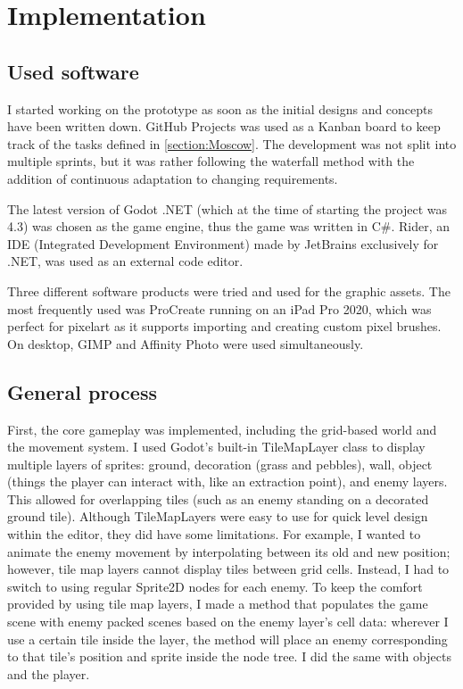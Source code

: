 \chapter{Implementation} \label{Chapter:Implementation}

\section{Used software}

I started working on the prototype as soon as the initial designs and concepts have been written down. GitHub Projects\cite{gitHub} was used as a Kanban board to keep track of the tasks defined in \ref{section:Moscow}. The development was not split into multiple sprints, but it was rather following the waterfall method with the addition of continuous adaptation to changing requirements.

The latest version of Godot .NET (which at the time of starting the project was 4.3) was chosen as the game engine, thus the game was written in C\#. Rider, an IDE (Integrated Development Environment) made by JetBrains exclusively for .NET, was used as an external code editor. 

Three different software products were tried and used for the graphic assets. The most frequently used was ProCreate running on an iPad Pro 2020, which was perfect for pixelart as it supports importing and creating custom pixel brushes. On desktop, GIMP and Affinity Photo were used simultaneously.

\section{General process}

First, the core gameplay was implemented, including the grid-based world and the movement system. I used Godot's built-in TileMapLayer class to display multiple layers of sprites: ground, decoration (grass and pebbles), wall, object (things the player can interact with, like an extraction point), and enemy layers. This allowed for overlapping tiles (such as an enemy standing on a decorated ground tile). Although TileMapLayers were easy to use for quick level design within the editor, they did have some limitations. For example, I wanted to animate the enemy movement by interpolating between its old and new position; however, tile map layers cannot display tiles between grid cells. Instead, I had to switch to using regular Sprite2D nodes for each enemy. To keep the comfort provided by using tile map layers, I made a method that populates the game scene with enemy packed scenes based on the enemy layer's cell data: wherever I use a certain tile inside the layer, the method will place an enemy corresponding to that tile's position and sprite inside the node tree. I did the same with objects and the player.

